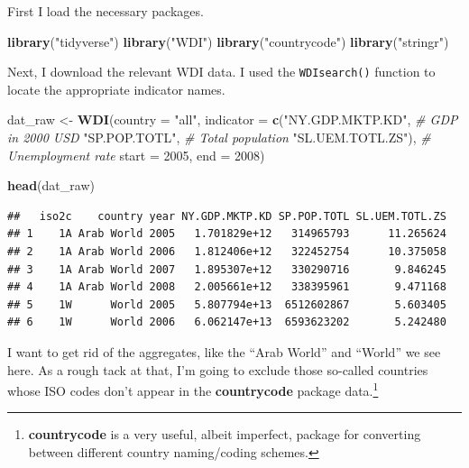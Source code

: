 \documentclass[12pt,oneside,openany]{book}
\newenvironment{Shaded}{\begin{snugshade}}{\end{snugshade}}
\newcommand{\KeywordTok}[1]{\textcolor[rgb]{0.13,0.29,0.53}{\textbf{#1}}}
\newcommand{\DataTypeTok}[1]{\textcolor[rgb]{0.13,0.29,0.53}{#1}}
\newcommand{\DecValTok}[1]{\textcolor[rgb]{0.00,0.00,0.81}{#1}}
\newcommand{\StringTok}[1]{\textcolor[rgb]{0.31,0.60,0.02}{#1}}
\newcommand{\CommentTok}[1]{\textcolor[rgb]{0.56,0.35,0.01}{\textit{#1}}}
\newcommand{\NormalTok}[1]{#1}
\begin{document}
First I load the necessary packages.

\begin{Shaded}
\begin{Highlighting}[]
\KeywordTok{library}\NormalTok{(}\StringTok{"tidyverse"}\NormalTok{)}
\KeywordTok{library}\NormalTok{(}\StringTok{"WDI"}\NormalTok{)}
\KeywordTok{library}\NormalTok{(}\StringTok{"countrycode"}\NormalTok{)}
\KeywordTok{library}\NormalTok{(}\StringTok{"stringr"}\NormalTok{)}
\end{Highlighting}
\end{Shaded}

Next, I download the relevant WDI data. I used the \texttt{WDIsearch()}
function to locate the appropriate indicator names.

\begin{Shaded}
\begin{Highlighting}[]
\NormalTok{dat_raw <-}\StringTok{ }\KeywordTok{WDI}\NormalTok{(}\DataTypeTok{country =} \StringTok{"all"}\NormalTok{,}
               \DataTypeTok{indicator =} \KeywordTok{c}\NormalTok{(}\StringTok{"NY.GDP.MKTP.KD"}\NormalTok{,  }\CommentTok{# GDP in 2000 USD}
                             \StringTok{"SP.POP.TOTL"}\NormalTok{,     }\CommentTok{# Total population}
                             \StringTok{"SL.UEM.TOTL.ZS"}\NormalTok{), }\CommentTok{# Unemployment rate}
               \DataTypeTok{start =} \DecValTok{2005}\NormalTok{,}
               \DataTypeTok{end =} \DecValTok{2008}\NormalTok{)}

\KeywordTok{head}\NormalTok{(dat_raw)}
\end{Highlighting}
\end{Shaded}

\begin{verbatim}
##   iso2c    country year NY.GDP.MKTP.KD SP.POP.TOTL SL.UEM.TOTL.ZS
## 1    1A Arab World 2005   1.701829e+12   314965793      11.265624
## 2    1A Arab World 2006   1.812406e+12   322452754      10.375058
## 3    1A Arab World 2007   1.895307e+12   330290716       9.846245
## 4    1A Arab World 2008   2.005661e+12   338395961       9.471168
## 5    1W      World 2005   5.807794e+13  6512602867       5.603405
## 6    1W      World 2006   6.062147e+13  6593623202       5.242480
\end{verbatim}

I want to get rid of the aggregates, like the ``Arab World'' and
``World'' we see here. As a rough tack at that, I'm going to exclude
those so-called countries whose ISO codes don't appear in the
\textbf{countrycode} package data.\footnote{\textbf{countrycode} is a
  very useful, albeit imperfect, package for converting between
  different country naming/coding schemes.}
\end{document}
